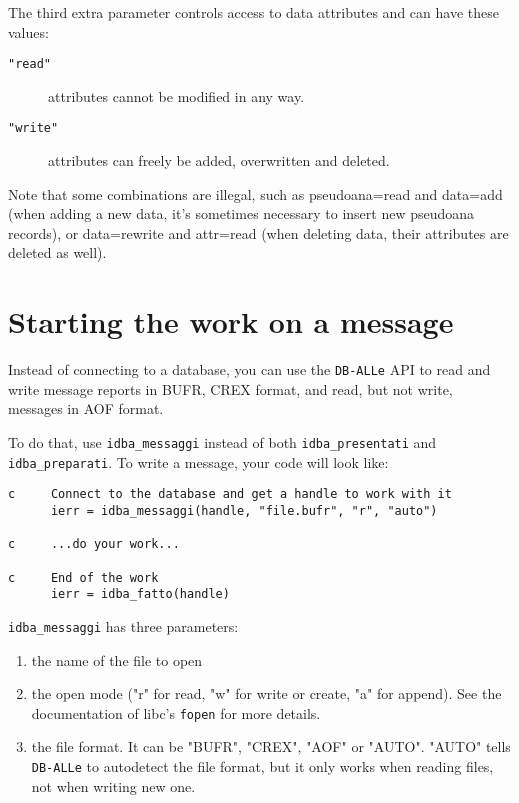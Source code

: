 \documentclass[final,12pt,a4paper,twoside]{book}
\newcommand{\dballe}{{\tt DB-ALLe}}
\begin{document}
The third extra parameter controls access to data attributes and can have
these values:

\begin{description}
\item[{\tt "read"}] attributes cannot be modified in any way.
\item[{\tt "write"}] attributes can freely be added, overwritten and deleted.
\end{description}

Note that some combinations are illegal, such as pseudoana=read and data=add
(when adding a new data, it's sometimes necessary to insert new pseudoana
records), or data=rewrite and attr=read (when deleting data, their attributes
are deleted as well).

\section{Starting the work on a message}

Instead of connecting to a database, you can use the \dballe{} API to read and
write message reports in BUFR, CREX format, and read, but not write, messages
in AOF format.

To do that, use {\tt idba\_messaggi} instead of both {\tt idba\_presentati} and
{\tt idba\_preparati}.  To write a message, your code will look like:

\begin{verbatim}
c     Connect to the database and get a handle to work with it
      ierr = idba_messaggi(handle, "file.bufr", "r", "auto")

c     ...do your work...

c     End of the work
      ierr = idba_fatto(handle)
\end{verbatim}

\label{fun-idba_messaggi}

{\tt idba\_messaggi} has three parameters:

\begin{enumerate}
\item the name of the file to open
\item the open mode ("r" for read, "w" for write or create, "a" for append).
      See the documentation of libc's {\tt fopen} for more details.
\item the file format.  It can be "BUFR", "CREX", "AOF" or "AUTO".  "AUTO"
      tells \dballe{} to autodetect the file format, but it only works when
      reading files, not when writing new one.
\end{enumerate}
\end{document}
